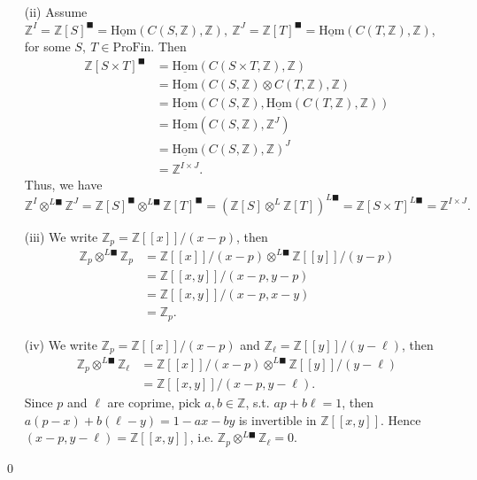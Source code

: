\documentclass[UTF8,12,a4paper]{ctexart}
\theoremstyle{definition}
\begin{document}
\begin{itemize}
	\item [(ii)] Assume $\mathbb{Z}^I=\mathbb{Z}[S]^\blacksquare=\underline{\text{Hom}}(C(S,\mathbb{Z}),\mathbb{Z}),\  \mathbb{Z}^J=\mathbb{Z}[T]^\blacksquare=\underline{\text{Hom}}(C(T,\mathbb{Z}),\mathbb{Z})$, for some $S,\ T\in \text{ProFin}.$ 
	Then
	\begin{align*}
	\mathbb{Z}[S\times T]^{\blacksquare}
	&=\underline{\text{Hom}}(C(S\times T,\mathbb{Z}),\mathbb{Z})\\
	&=\underline{\text{Hom}}(C(S,\mathbb{Z})\otimes C(T,\mathbb{Z}),\mathbb{Z})\\
	&=\underline{\text{Hom}}(C(S,\mathbb{Z}),\underline{\text{Hom}}( C(T,\mathbb{Z}),\mathbb{Z}))\\
	&=\underline{\text{Hom}}(C(S,\mathbb{Z}),\mathbb{Z}^J)\\
	&=\underline{\text{Hom}}(C(S,\mathbb{Z}),\mathbb{Z})^J\\
	&=\mathbb{Z}^{I\times J}.
	\end{align*}
	Thus, we have
	$$
	\mathbb{Z}^I\otimes^{L\blacksquare} \mathbb{Z}^J=\mathbb{Z}[S]^\blacksquare\otimes^{L\blacksquare}\mathbb{Z}[T]^\blacksquare=(\mathbb{Z}[S]\otimes^{L}\mathbb{Z}[T])^{L\blacksquare}=\mathbb{Z}[S\times T]^{L\blacksquare}=\mathbb{Z}^{I\times J}.
	$$
	\item [(iii)]
	We write $\mathbb{Z}_p=\mathbb{Z}[[x]]/(x-p)$, then
	\begin{align*}
		\mathbb{Z}_p\otimes^{L\blacksquare}\mathbb{Z}_p
	&=\mathbb{Z}[[x]]/(x-p)\otimes^{L\blacksquare}\mathbb{Z}[[y]]/(y-p)\\
	&=\mathbb{Z}[[x,y]]/(x-p,y-p)\\
	&=\mathbb{Z}[[x,y]]/(x-p,x-y)\\
	&=\mathbb{Z}_p.
	\end{align*}
	\item [(iv)]
		We write $\mathbb{Z}_p=\mathbb{Z}[[x]]/(x-p)$ and $\mathbb{Z}_\ell=\mathbb{Z}[[y]]/(y-\ell)$, then
	\begin{align*}
	\mathbb{Z}_p\otimes^{L\blacksquare}\mathbb{Z}_\ell 
	&=\mathbb{Z}[[x]]/(x-p)\otimes^{L\blacksquare}\mathbb{Z}[[y]]/(y-\ell)\\
	&=\mathbb{Z}[[x,y]]/(x-p,y-\ell).
	\end{align*}
	Since $p$ and $\ell$ are coprime, pick $a, b\in\mathbb{Z}$, s.t. $ap+b\ell =1$, then $a(p-x)+b(\ell-y)=1-ax-by$ is invertible in $\mathbb{Z}[[x,y]].$ Hence $(x-p,y-\ell)=\mathbb{Z}[[x,y]]$, i.e. $	\mathbb{Z}_p\otimes^{L\blacksquare}\mathbb{Z}_\ell =0.$
\end{itemize}
\qed













	
\end{document}
